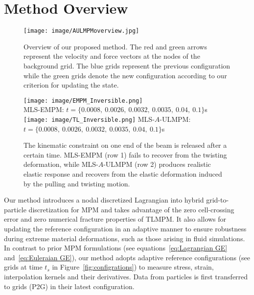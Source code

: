 \section{Method Overview}
\label{sec:overview}
%
\begin{figure}[h]
\centering
\texttt{[image: image/AULMPMoverview.jpg]}
\vspace{-7mm}
\caption{Overview of our proposed method.
The red and green arrows represent the velocity and force vectors at the nodes of the background grid. The blue grids represent the previous configuration while the green grids denote the new configuration according to our criterion for updating the state.}
\label{fig:A_ULMPM_overview}
\vspace{-3mm}
\end{figure}
%
\begin{figure*}[h]
    \vspace{-4mm}
    \centering
    \texttt{[image: image/EMPM\_Inversible.png]} \\
   MLS-EMPM: $t=\{0.0008,\:0.0026,\:0.0032,\:0.0035,\: 0.04,\:0.1\}$s\\
    \texttt{[image: image/TL\_Inversible.png]}
    MLS-$A$-ULMPM: $t=\{0.0008,\:0.0026,\:0.0032,\:0.0035,\: 0.04,\:0.1\}$s\\
    \vspace{-4mm}
    \caption{The kinematic constraint on one end of the beam is released after a certain time. MLS-EMPM (row 1) fails to recover from the twisting deformation, while  MLS-$A$-ULMPM (row 2) produces realistic elastic response and recovers from the elastic deformation induced by the pulling and twisting motion.} 
    \label{fig:bar_twisting_inv_deformation}
    \vspace{-5mm}
\end{figure*}
%
Our method introduces a nodal discretized Lagrangian into hybrid grid-to-particle discretization for MPM and takes advantage of the zero cell-crossing error and zero numerical fracture properties of TLMPM. It also allows for updating the reference configuration in an adaptive manner to ensure robustness during extreme material deformations, such as those arising in fluid simulations. 
In contrast to prior MPM formulations (see equations~\eqref{eq:Lagrangian GE} and~\eqref{eq:Euleraian GE}), our method adopts adaptive reference configurations (see grids at time $t_s$ in Figure~\ref{fig:configrations}) to measure stress, strain, interpolation kernels and their derivatives. Data from particles is first transferred to grids (P2G) in their latest configuration. 
